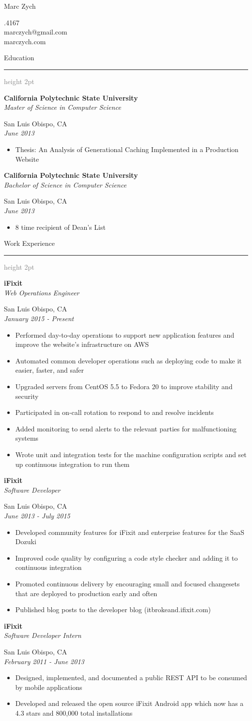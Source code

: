 \documentclass[letterpaper,11pt]{article}
\newcommand{\resauthor}[4]{
   \begin{minipage}[c]{.4\textwidth}
      \raggedright
      {\Huge #1}
   \end{minipage}
   \hfill
   \begin{minipage}[c]{.4\textwidth}
      \raggedleft
      #2\\
      #3\\
      #4
   \end{minipage}
}
\newcommand{\ressectiondivider}{
   \vspace{5pt}
   \textcolor{gray}{\hrule height 2pt}
}
\newcommand{\resitem}[1]{\item #1 \vspace{-2pt}}
\newcommand{\resheading}[1]{
   \vspace{4pt}
   {\Large #1}
   \ressectiondivider
   \vspace{10pt}
}
\newcommand{\ressubheading}[4]{
   \begin{minipage}[t]{10cm}
      \flushleft
      \textbf{#1}\\
      \textit{#3}\\
   \end{minipage}
   \hfill
   \begin{minipage}[t]{7cm}
      \flushright
      #2\\
      \textit{#4}\\
   \end{minipage}
}
\begin{document}
\resauthor{Marc Zych}{805.217.4167}{marczych@gmail.com}{marczych.com}

\vspace{20pt}

\resheading{Education}
\ressubheading{California Polytechnic State University}{San Luis Obispo, CA}{Master of Science in Computer Science}{June 2013}
\begin{itemize}
   \resitem{Thesis: An Analysis of Generational Caching Implemented in a Production Website}
\end{itemize}
\ressubheading{California Polytechnic State University}{San Luis Obispo, CA}{Bachelor of Science in Computer Science}{June 2013}
\begin{itemize}
   \resitem{8 time recipient of Dean's List}
\end{itemize}

\resheading{Work Experience}
\ressubheading{iFixit}{San Luis Obispo, CA}{Web Operations Engineer}{January 2015 - Present}
\begin{itemize}
   \resitem{Performed day-to-day operations to support new application features and improve the website's infrastructure on AWS}
   \resitem{Automated common developer operations such as deploying code to make it easier, faster, and safer}
   \resitem{Upgraded servers from CentOS 5.5 to Fedora 20 to improve stability and security}
   \resitem{Participated in on-call rotation to respond to and resolve incidents}
   \resitem{Added monitoring to send alerts to the relevant parties for malfunctioning systems}
   \resitem{Wrote unit and integration tests for the machine configuration scripts and set up continuous integration to run them}
\end{itemize}
\ressubheading{iFixit}{San Luis Obispo, CA}{Software Developer}{June 2013 - July 2015}
\begin{itemize}
   \resitem{Developed community features for iFixit and enterprise features for the SaaS Dozuki}
   \resitem{Improved code quality by configuring a code style checker and adding it to continuous integration}
   \resitem{Promoted continuous delivery by encouraging small and focused changesets that are deployed to production early and often}
   \resitem{Published blog posts to the developer blog (itbrokeand.ifixit.com)}
\end{itemize}
\ressubheading{iFixit}{San Luis Obispo, CA}{Software Developer Intern}{February 2011 - June 2013}
\begin{itemize}
   \resitem{Designed, implemented, and documented a public REST API to be consumed by mobile applications}
   \resitem{Developed and released the open source iFixit Android app which now has a 4.3 stars and 800,000 total installations}
\end{itemize}
\end{document}
